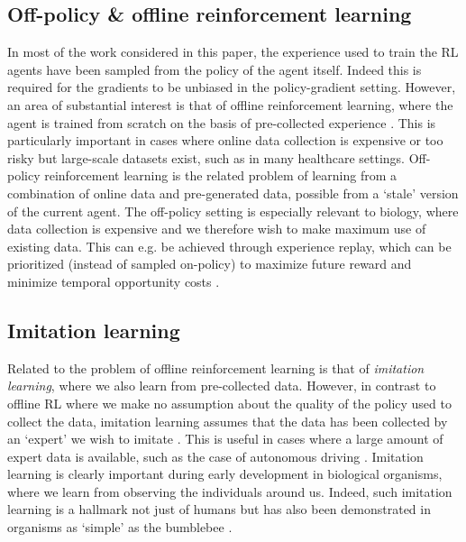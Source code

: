\subsection*{Off-policy \& offline reinforcement learning}
In most of the work considered in this paper, the experience used to train the RL agents have been sampled from the policy of the agent itself.
Indeed this is required for the gradients to be unbiased in the policy-gradient setting.
However, an area of substantial interest is that of offline reinforcement learning, where the agent is trained from scratch on the basis of pre-collected experience \citep{levine2020offline}.
This is particularly important in cases where online data collection is expensive or too risky but large-scale datasets exist, such as in many healthcare settings.
Off-policy reinforcement learning is the related problem of learning from a combination of online data and pre-generated data, possible from a `stale' version of the current agent.
The off-policy setting is especially relevant to biology, where data collection is expensive and we therefore wish to make maximum use of existing data.
This can e.g. be achieved through experience replay, which can be prioritized (instead of sampled on-policy) to maximize future reward and minimize temporal opportunity costs \citep{mattar2018prioritized, agrawal2022temporal}.

\subsection*{Imitation learning}
Related to the problem of offline reinforcement learning is that of \emph{imitation learning}, where we also learn from pre-collected data.
However, in contrast to offline RL where we make no assumption about the quality of the policy used to collect the data, imitation learning assumes that the data has been collected by an `expert' we wish to imitate \citep{levine2020offline}.
This is useful in cases where a large amount of expert data is available, such as the case of autonomous driving \citep{pan2017agile}.
Imitation learning is clearly important during early development in biological organisms, where we learn from observing the individuals around us.
Indeed, such imitation learning is a hallmark not just of humans but has also been demonstrated in organisms as `simple' as the bumblebee \citep{loukola2017bumblebees}.

